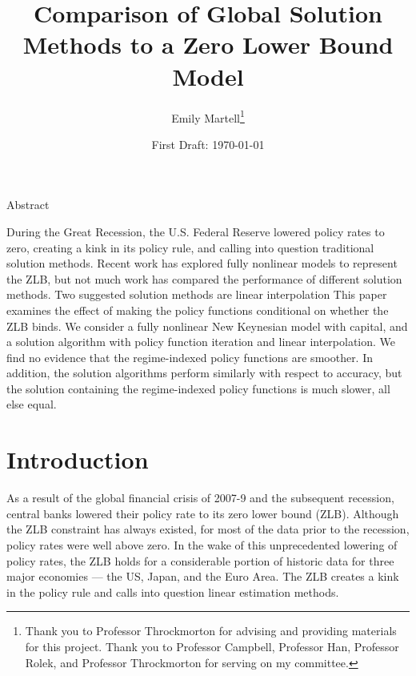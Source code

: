 \documentclass[12pt, final]{article}
\title{Comparison of Global Solution Methods to a Zero Lower Bound Model}
\date{\small First Draft: \today}
\author{Emily Martell\thanks{Thank you to Professor Throckmorton for advising and providing materials for this project. Thank you to Professor Campbell, Professor Han, Professor Rolek, and Professor Throckmorton for serving on my committee.}}
\newcommand{\forceindent}{\leavevmode{\parindent=15pt\indent}}
\begin{document}
\maketitle
\bigskip
\begin{center}
\fontsize{14pt}{\baselineskip}\sc Abstract%
\end{center}

\onehalfspacing
\begin{changemargin}{1cm}{1cm}

{\small \forceindent During the Great Recession, the U.S. Federal Reserve lowered policy rates to zero, creating a kink in its policy rule, and calling into question traditional solution methods. Recent work has explored fully nonlinear models to represent the ZLB, but not much work has compared the performance of different solution methods. Two suggested solution methods are linear interpolation This paper examines the effect of making the policy functions conditional on whether the ZLB binds. We consider a fully nonlinear New Keynesian model with capital, and a solution algorithm with policy function iteration and linear interpolation. We find no evidence that the regime-indexed policy functions are smoother. In addition, the solution algorithms perform similarly with respect to accuracy, but the solution containing the regime-indexed policy functions is much slower, all else equal.}
\end{changemargin}
\vfill
\pagebreak

\section{Introduction}

As a result of the global financial crisis of 2007-9 and the subsequent recession, central banks lowered
their policy rate to its zero lower bound (ZLB). Although the ZLB constraint has always existed,
for most of the data prior to the recession, policy rates were well above zero. In the wake of this
unprecedented lowering of policy rates, the ZLB holds for a considerable portion of historic data
for three major economies --- the US, Japan, and the Euro Area. The ZLB creates a kink in the policy
rule and calls into question linear estimation methods. 
\end{document}
